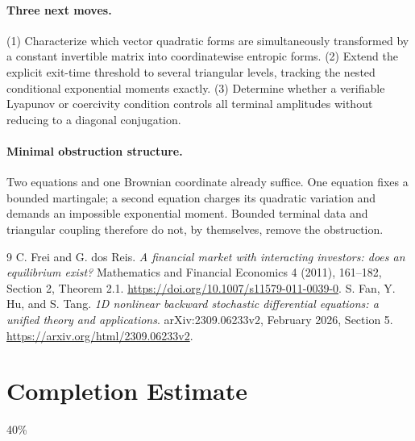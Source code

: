 \documentclass[11pt,a4paper]{article}
\theoremstyle{definition}
\theoremstyle{remark}
\begin{document}
\paragraph{Three next moves.}
(1) Characterize which vector quadratic forms are simultaneously transformed by a constant invertible matrix into coordinatewise entropic forms. (2) Extend the explicit exit-time threshold to several triangular levels, tracking the nested conditional exponential moments exactly. (3) Determine whether a verifiable Lyapunov or coercivity condition controls all terminal amplitudes without reducing to a diagonal conjugation.

\paragraph{Minimal obstruction structure.}
Two equations and one Brownian coordinate already suffice. One equation fixes a bounded martingale; a second equation charges its quadratic variation and demands an impossible exponential moment. Bounded terminal data and triangular coupling therefore do not, by themselves, remove the obstruction.

\begin{thebibliography}{9}
 C. Frei and G. dos Reis. \emph{A financial market with interacting investors: does an equilibrium exist?} Mathematics and Financial Economics 4 (2011), 161--182, Section 2, Theorem 2.1. \url{https://doi.org/10.1007/s11579-011-0039-0}.
 S. Fan, Y. Hu, and S. Tang. \emph{1D nonlinear backward stochastic differential equations: a unified theory and applications}. arXiv:2309.06233v2, February 2026, Section 5. \url{https://arxiv.org/html/2309.06233v2}.
\end{thebibliography}

\section{Completion Estimate}
40\%
\end{document}

